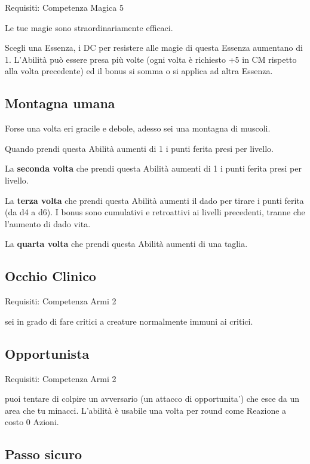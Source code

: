 \documentclass[a4paper,11pt,twoside,openany]{book}
\begin{document}
Requisiti: Competenza Magica 5

Le tue magie sono straordinariamente efficaci.

Scegli una Essenza, i DC per resistere alle magie di questa Essenza aumentano di 1. L'Abilità può essere presa più volte (ogni volta è richiesto +5 in CM rispetto alla volta precedente) ed il bonus si somma o si applica ad altra Essenza.

\subsection{Montagna umana}

Forse una volta eri gracile e debole, adesso sei una montagna di muscoli.

Quando prendi questa Abilità aumenti di 1 i punti ferita presi per livello.

La \textbf{seconda volta} che prendi questa Abilità aumenti di 1 i punti ferita presi per livello.

La \textbf{terza volta} che prendi questa Abilità aumenti il dado per tirare i punti ferita (da d4 a d6).
I bonus sono cumulativi e retroattivi ai livelli precedenti, tranne che l’aumento di dado vita.

La \textbf{quarta volta} che prendi questa Abilità aumenti di una taglia.

\subsection{Occhio Clinico}

Requisiti: Competenza Armi 2

sei in grado di fare critici a creature normalmente immuni ai critici.

\subsection{Opportunista}

Requisiti: Competenza Armi 2

puoi tentare di colpire un avversario (un attacco di opportunita') che esce da un area che tu minacci. L'abilità è usabile una volta per round come Reazione a costo 0 Azioni.

\subsection{Passo sicuro}
\end{document}
